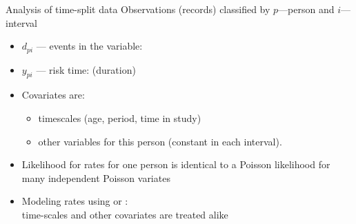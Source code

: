 \begin{frame}[fragile]{Analysis of time-split data}
Observations (records) classified by $p$---person and $i$---interval
\begin{itemize}[<+->]
\item $d_{pi}$ --- events in the variable: 
\item $y_{pi}$ --- risk time:  (duration)\\
\item Covariates are:

\begin{itemize}
\item timescales (age, period, time in study)
\item other variables for this person (constant in each interval).
\end{itemize}

\item Likelihood for rates for one person is identical to a Poisson
  likelihood for many independent Poisson variates
\item Modeling rates using  or :\\
  time-scales and other covariates are treated alike
\end{itemize}
\end{frame}


